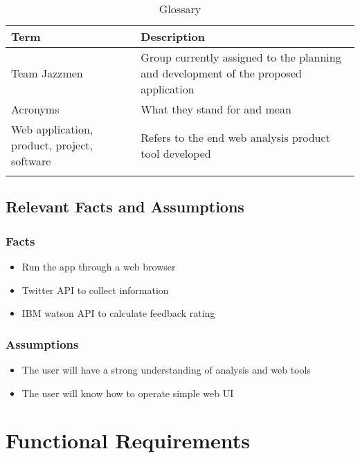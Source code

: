 \documentclass[12pt]{article}
\begin{document}
\begin{table}[h]
\centering
\caption{Glossary}
\begin{tabularx}{\textwidth}{|l|X|}
\Xhline{2\arrayrulewidth}
\bf Term & \bf Description\\
\hline
Team Jazzmen & Group currently assigned to the planning and development of the proposed application\\\hline
Acronyms & What they stand for and mean\\\hline
Web application, product, project, software & Refers to the end web analysis product tool developed\\
\Xhline{2\arrayrulewidth}
\end{tabularx}
\end{table}

\subsection{Relevant Facts and Assumptions} %
\subsubsection{Facts}
\begin{itemize}
\item Run the app through a web browser
\item Twitter API to collect information
\item IBM watson API to calculate feedback rating
\end{itemize}

\subsubsection{Assumptions}
\begin{itemize}
\item The user will have a strong understanding of analysis and web tools
\item The user will know how to operate simple web UI
\end{itemize}

\newpage
\section{Functional Requirements}

\end{document}
